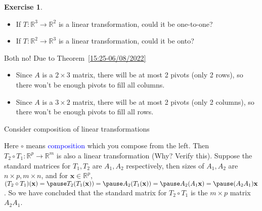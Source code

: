 \documentclass{beamer}
\theoremstyle{definition}
\newtheorem{exercise}[theorem]{Exercise}
\theoremstyle{remark}
\begin{document}
\begin{frame}[t]
\begin{exercise}
\begin{itemize}
\item If $T:\mathbb R^3\to\mathbb R^2$ is a linear transformation, could it be one-to-one?
\item If $T:\mathbb R^2\to\mathbb R^3$ is a linear transformation, could it be onto?
\end{itemize}
\end{exercise}

\begin{solution}
Both no! Due to Theorem~\ref{15:25-06/08/2022}
\begin{itemize}
\item Since $A$ is a $2\times3$ matrix, there will be at most 2 pivots (only 2 rows), so there won't be enough pivots to fill all columns.\pause
\item Since $A$ is a $3\times2$ matrix, there will be at most 2 pivots (only 2 columns), so there won't be enough pivots to fill all rows.
\end{itemize}
\end{solution}
\end{frame}

\begin{frame}[t]
\begin{definition}
Consider composition of linear transformations
\begin{center}
\end{center}
Here $\circ$ means \textcolor{blue}{composition} which you compose from the left. Then $T_2\circ T_1:\mathbb R^p\to\mathbb R^m$ is also a linear transformation (Why? Verify this)\pause. Suppose the standard matrices for $T_1,T_2$ are $A_1,A_2$ respectively, then sizes of $A_1,A_2$ are\pause $n\times p, m\times n$, and for $\mathbf x\in\mathbb R^p$, $(T_2\circ T_1)(\mathbf x)=\pause T_2(T_1(\mathbf x))=\pause A_2(T_1(\mathbf x))=\pause A_2(A_1\mathbf x)=\pause (A_2A_1)\mathbf x$\pause. So we have concluded that the standard matrix for $T_2\circ T_1$ is the $m\times p$ matrix $A_2A_1$.
\end{definition}
\end{frame}
\end{document}
